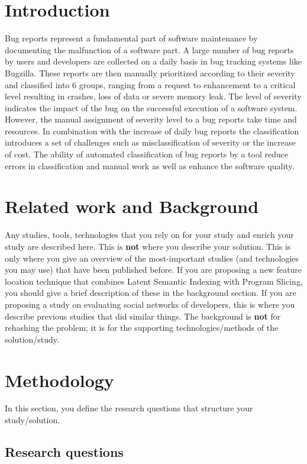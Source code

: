 \documentclass[sigconf,screen]{acmart}
\begin{document}
\section{Introduction}
Bug reports represent a fundamental part of software maintenance by documenting the malfunction of a software part. A large number of bug reports by users and developers are collected on a daily basis in bug tracking systems like Bugzilla. These reports are then manually prioritized according to their severity and classified into 6 groups, ranging from a request to enhancement to a critical level resulting in crashes, loss of data or severe memory leak. The level of severity indicates the impact of the bug on the successful execution of a software system. 
However, the manual assignment of severity level to a bug reports take time and resources. In combination with the increase of daily bug reports the classification introduces a set of challenges such as misclassification of severity or the increase of cost. The ability of automated classification of bug reports by a tool reduce errors in classification and manual work as well as enhance the software quality.


\section{Related work and Background}

Any studies, tools, technologies that you rely on for your study and enrich your study are described here. This is \textbf{not} where you describe your solution. This is only where you give an overview of the most-important studies (and technologies you may use) that have been published before. If you are proposing a new feature location technique that combines Latent Semantic Indexing with Program Slicing, you should give a brief description of these in the background section. If you are proposing a study on evaluating social networks of developers, this is where you describe previous studies that did similar things. The background is \textbf{not} for rehashing the problem; it is for the supporting technologies/methods of the solution/study.


\section{Methodology}

In this section, you define the research questions that structure your study/solution.

\subsection{Research questions}
\end{document}
